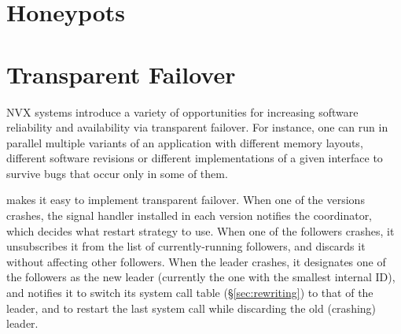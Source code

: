









\section{Honeypots}

\section{Transparent Failover}
\label{sec:failover}


NVX systems introduce a variety of opportunities for increasing
software reliability and availability via transparent failover.  For
instance, one can run in parallel multiple variants of an application with
different memory layouts, different software revisions or different
implementations of a given interface to survive bugs that occur 
only in some of them.   

\nx makes it easy to implement transparent failover.  When one of the
versions crashes, the  signal handler installed in each
version notifies the coordinator, which decides what restart strategy
to use.  When one of the followers crashes, it unsubscribes it from
the list of currently-running followers, and discards it without
affecting other followers.  When the leader crashes, it designates one
of the followers as the new leader (currently the one with the
smallest internal ID), and notifies it to switch its system call table
(\S\ref{sec:rewriting}) to that of the leader, and to restart the last
system call while discarding the old (crashing) leader.

